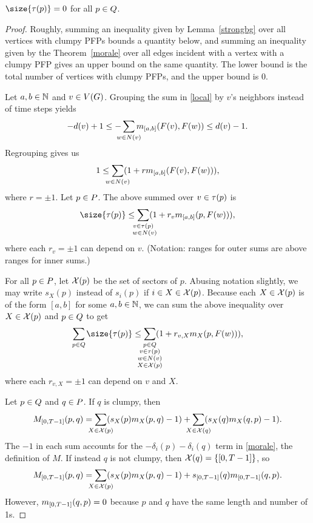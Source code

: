 \begin{theorem}\label{nct}
$\size{\pfpverts{p}} = 0$ for all $p \in \cpfps$.
\end{theorem}

\begin{proof}
Roughly, summing an inequality given by Lemma~\ref{strongbg} over all vertices
with clumpy PFPs bounds a quantity below, and summing an inequality given by
the Theorem~\ref{morale} over all edges incident with a vertex with a clumpy
PFP gives an upper bound on the same quantity. The lower bound is the total
number of vertices with clumpy PFPs, and the upper bound is 0.

Let $a,b \in \mathbb{N}$ and $v \in V(G)$. Grouping the sum in \eqref{local} by $v$'s
neighbors instead of time steps yields
\[
  -\deg{v} + 1 \leq -\smashoperator{\sum_{w \in
      \N{v}}}\misb{[a,b]}{\pfp{v}}{\pfp{w}} \leq \deg{v} - 1.
\]
Regrouping gives us
\[
  1 \leq \smashoperator{\sum_{w \in \N{v}}}(1 +
  r\misb{[a,b]}{\pfp{v}}{\pfp{w}}),
\]
where $r = \pm1$. Let $p \in \pfps$. The above summed over $v \in \pfpverts{p}$
is
\[
  \size{\pfpverts{p}} \leq \smashoperator{\sum_{\substack{v \in \pfpverts{p}
        \\\ w \in \N{v}}}}(1 + r_v\misb{[a,b]}{p}{\pfp{w}}),
\]
where each $r_v = \pm1$ can depend on $v$. (Notation: ranges for outer sums are
above ranges for inner sums.)

For all $p \in \pfps$, let $\mathcal{X}(p)$ be the set of sectors of $p$. Abusing
notation slightly, we may write $s_X(p)$ instead of $s_i(p)$ if $i \in X \in
\mathcal{X}(p)$. Because each $X \in \mathcal{X}(p)$ is of the form $[a,b]$ for some $a,b
\in \mathbb{N}$, we can sum the above inequality over $X \in \mathcal{X}(p)$ and $p \in
\cpfps$ to get
\begin{equation}\label{almost}
  \smashoperator[r]{\sum_{p \in \cpfps}}\size{\pfpverts{p}} \leq
  \smashoperator{\sum_{\substack{
        p \in \cpfps \\ v \in \pfpverts{p} \\
        w \in \N{v} \\ X \in \sctr{p}
  }}}(1 + r_{v,X}\misb{X}{p}{\pfp{w}}),
\end{equation}
where each $r_{v,X} = \pm1$ can depend on $v$ and $X$.

Let $p \in \cpfps$ and $q \in \pfps$. If $q$ is clumpy, then
\[
  M_{[0,\period-1]}(p,q) =
  \smashoperator{\sum_{X \in \sctr{p}}}(s_X(p)\misb{X}{p}{q} - 1) +
  \smashoperator{\sum_{X \in \sctr{q}}}(s_X(q)\misb{X}{q}{p} - 1).
\]
The $-1$ in each sum accounts for the $-\delta_i(p)-\delta_i(q)$ term in
\eqref{morale}, the definition of $M$. If instead $q$ is not clumpy, then
$\sctr{q} = \{[0,\period-1]\}$, so
\[
  M_{[0,\period-1]}(p,q) =
  \smashoperator{\sum_{X \in \sctr{p}}}(s_X(p)\misb{X}{p}{q} - 1) +
  s_{[0,\period-1]}(q)\misb{[0,\period-1]}{q}{p}.
\]
However, $\misb{[0,\period-1]}{q}{p} = 0$ because $p$ and $q$ have the same
length and number of 1s.


\end{proof}

